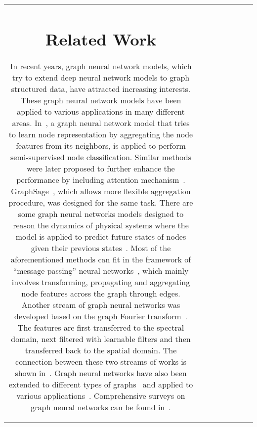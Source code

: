 \documentclass[sigconf]{acmart}
\begin{document}
{\begin{table}
\begin{center}
\begin{tabular} { c c c c c c c c }
 \section{Related Work} \label{sec:related_work}

In recent years, graph neural network models, which try to extend deep neural network models to graph structured data, have attracted increasing interests. These graph neural network models have been applied to various applications in many different areas. In~\cite{kipf2016semi}, a graph neural network model that tries to learn node representation by aggregating the node features from its neighbors, is applied to perform semi-supervised node classification. Similar methods were later proposed to further enhance the performance by including attention mechanism~\cite{velivckovic2017graph}. GraphSage~\cite{ying2018hierarchical}, which allows more flexible aggregation procedure, was designed for the same task. There are some graph neural networks models designed to reason the dynamics of physical systems where the model is applied to predict future states of nodes given their previous states~\cite{battaglia2016interaction,sanchez2018graph}. Most of the aforementioned methods can fit in the framework of ``message passing'' neural networks~\cite{gilmer2017neural}, which mainly involves transforming, propagating and aggregating node features across the graph through edges. Another stream of graph neural networks was developed based on the graph Fourier transform~\cite{defferrard2016convolutional,bruna2013spectral,henaff2015deep,levie2017cayleynets}. The features are first transferred to the spectral domain,  next filtered with learnable filters and then transferred back to the spatial domain. The connection between these two streams of works is shown in~\cite{defferrard2016convolutional,kipf2016semi}. Graph neural networks have also been extended to different types of graphs~\cite{ma2018dynamic,ma2019multi,derr2018signed} and applied to various applications~\cite{wang2018zero,fan2019graph,ying2018graph,monti2017geometric,schlichtkrull2018modeling,trivedi2017know}.
Comprehensive surveys on graph neural networks can be found in~\cite{zhou2018graph,wu2019comprehensive,zhang2018deep,battaglia2018relational}.


\end{tabular}
\end{center}
\end{table}}
\end{document}
